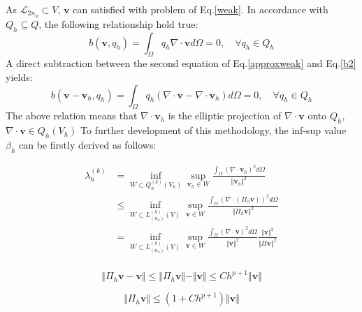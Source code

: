 As $\mathcal L_{2n_u} \subset V$, $\boldsymbol v$ can satisfied with problem of Eq.\eqref{weak}.
In accordance with $Q_h \subseteq Q$, the following relationship hold true:
\begin{equation}\label{b2}
b(\boldsymbol v,q_h) = \int_{\Omega} q_h \nabla \cdot \boldsymbol v d\Omega = 0, \quad \forall q_h \in Q_h
\end{equation}
A direct subtraction between the second equation of Eq.\eqref{approxweak} and Eq.\eqref{b2} yields: 
\begin{equation}
b(\boldsymbol v - \boldsymbol v_h, q_h) = \int_{\Omega} q_h (\nabla\cdot \boldsymbol v - \nabla \cdot \boldsymbol v_h)d\Omega = 0, \quad \forall q_h \in Q_h
\end{equation}
The above relation means that $\nabla \cdot \boldsymbol v_h$ is the elliptic projection of $\nabla \cdot \boldsymbol v$ onto $Q_h$, 
$\nabla \cdot \boldsymbol v \in Q_h(V_h)$
To further development of this methodology, the inf-sup value $\beta_h$ can be firstly derived as follows:


\begin{equation}
\begin{split}
    \lambda^{(k)}_h &= \inf_{W \subset Q_h^{(k)}(V_h)} \sup_{\boldsymbol v_h \in W} \frac{\int_{\Omega} (\nabla \cdot \boldsymbol v_h)^2 d\Omega}{\Vert \boldsymbol v_h \Vert^2} \\
    &\le \inf_{W \subset L^{(k)}_{(n_u)}(V)} \sup_{\boldsymbol v \in W} \frac{\int_{\Omega} (\nabla \cdot (\Pi_h \boldsymbol v))^2 d\Omega}{\Vert \Pi_h \boldsymbol v \Vert^2} \\
    &= \inf_{W \subset L^{(k)}_{(n_u)}(V)} \sup_{\boldsymbol v \in W} \frac{\int_{\Omega} (\nabla \cdot \boldsymbol v)^2 d\Omega}{\Vert \boldsymbol v \Vert^2}
    \frac{\Vert \boldsymbol v \Vert^2}{\Vert \Pi \boldsymbol v \Vert^2}\\
\end{split}
\end{equation}

\begin{equation}
\Vert \Pi_h \boldsymbol v - \boldsymbol v \Vert \le \Vert \Pi_h \boldsymbol v \Vert - \Vert \boldsymbol v \Vert \le Ch^{p+1}\Vert \boldsymbol v \Vert
\end{equation}

\begin{equation}
    \Vert \Pi_h \boldsymbol v \Vert \le (1+Ch^{p+1})\Vert \boldsymbol v \Vert
\end{equation}


